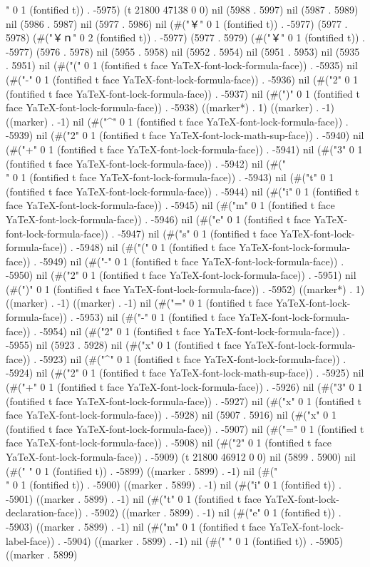" 0 1 (fontified t)) . -5975) (t 21800 47138 0 0) nil (5988 . 5997) nil (5987 . 5989) nil (5986 . 5987) nil (5977 . 5986) nil (#("￥" 0 1 (fontified t)) . -5977) (5977 . 5978) (#("￥ｎ" 0 2 (fontified t)) . -5977) (5977 . 5979) (#("￥" 0 1 (fontified t)) . -5977) (5976 . 5978) nil (5955 . 5958) nil (5952 . 5954) nil (5951 . 5953) nil (5935 . 5951) nil (#("(" 0 1 (fontified t face YaTeX-font-lock-formula-face)) . -5935) nil (#("-" 0 1 (fontified t face YaTeX-font-lock-formula-face)) . -5936) nil (#("2" 0 1 (fontified t face YaTeX-font-lock-formula-face)) . -5937) nil (#(")" 0 1 (fontified t face YaTeX-font-lock-formula-face)) . -5938) ((marker*) . 1) ((marker) . -1) ((marker) . -1) nil (#("^" 0 1 (fontified t face YaTeX-font-lock-formula-face)) . -5939) nil (#("2" 0 1 (fontified t face YaTeX-font-lock-math-sup-face)) . -5940) nil (#("+" 0 1 (fontified t face YaTeX-font-lock-formula-face)) . -5941) nil (#("3" 0 1 (fontified t face YaTeX-font-lock-formula-face)) . -5942) nil (#("\\" 0 1 (fontified t face YaTeX-font-lock-formula-face)) . -5943) nil (#("t" 0 1 (fontified t face YaTeX-font-lock-formula-face)) . -5944) nil (#("i" 0 1 (fontified t face YaTeX-font-lock-formula-face)) . -5945) nil (#("m" 0 1 (fontified t face YaTeX-font-lock-formula-face)) . -5946) nil (#("e" 0 1 (fontified t face YaTeX-font-lock-formula-face)) . -5947) nil (#("s" 0 1 (fontified t face YaTeX-font-lock-formula-face)) . -5948) nil (#("(" 0 1 (fontified t face YaTeX-font-lock-formula-face)) . -5949) nil (#("-" 0 1 (fontified t face YaTeX-font-lock-formula-face)) . -5950) nil (#("2" 0 1 (fontified t face YaTeX-font-lock-formula-face)) . -5951) nil (#(")" 0 1 (fontified t face YaTeX-font-lock-formula-face)) . -5952) ((marker*) . 1) ((marker) . -1) ((marker) . -1) nil (#("=" 0 1 (fontified t face YaTeX-font-lock-formula-face)) . -5953) nil (#("-" 0 1 (fontified t face YaTeX-font-lock-formula-face)) . -5954) nil (#("2" 0 1 (fontified t face YaTeX-font-lock-formula-face)) . -5955) nil (5923 . 5928) nil (#("x" 0 1 (fontified t face YaTeX-font-lock-formula-face)) . -5923) nil (#("^" 0 1 (fontified t face YaTeX-font-lock-formula-face)) . -5924) nil (#("2" 0 1 (fontified t face YaTeX-font-lock-math-sup-face)) . -5925) nil (#("+" 0 1 (fontified t face YaTeX-font-lock-formula-face)) . -5926) nil (#("3" 0 1 (fontified t face YaTeX-font-lock-formula-face)) . -5927) nil (#("x" 0 1 (fontified t face YaTeX-font-lock-formula-face)) . -5928) nil (5907 . 5916) nil (#("x" 0 1 (fontified t face YaTeX-font-lock-formula-face)) . -5907) nil (#("=" 0 1 (fontified t face YaTeX-font-lock-formula-face)) . -5908) nil (#("2" 0 1 (fontified t face YaTeX-font-lock-formula-face)) . -5909) (t 21800 46912 0 0) nil (5899 . 5900) nil (#(" " 0 1 (fontified t)) . -5899) ((marker . 5899) . -1) nil (#("\\" 0 1 (fontified t)) . -5900) ((marker . 5899) . -1) nil (#("i" 0 1 (fontified t)) . -5901) ((marker . 5899) . -1) nil (#("t" 0 1 (fontified t face YaTeX-font-lock-declaration-face)) . -5902) ((marker . 5899) . -1) nil (#("e" 0 1 (fontified t)) . -5903) ((marker . 5899) . -1) nil (#("m" 0 1 (fontified t face YaTeX-font-lock-label-face)) . -5904) ((marker . 5899) . -1) nil (#(" " 0 1 (fontified t)) . -5905) ((marker . 5899) 